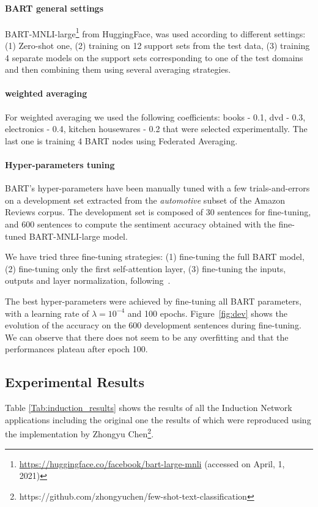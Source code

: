 \documentclass{esannV2}
\begin{document}
        \paragraph{BART general settings} BART-MNLI-large\footnote{\url{https://huggingface.co/facebook/bart-large-mnli} (accessed on April, 1, 2021)} from HuggingFace, was used according to different settings: (1) Zero-shot one, (2) training on 12 support sets from the test data, (3) training 4 separate models on the support sets corresponding to one of the test domains and then combining them using several averaging strategies.
        
        \paragraph{weighted averaging} For weighted averaging we used the following coefficients: books - 0.1, dvd - 0.3, electronics - 0.4, kitchen housewares - 0.2 that were selected experimentally. The last one is training 4 BART nodes using Federated Averaging. 
        
        \paragraph{Hyper-parameters tuning}
        BART's hyper-parameters have been manually tuned with a few trials-and-errors
        on a development set extracted from the \textit{automotive} subset of the Amazon Reviews corpus.
        The development set is composed of 30 sentences for fine-tuning, and 600 sentences to compute the sentiment accuracy obtained with the fine-tuned BART-MNLI-large model.
        
        We have tried three fine-tuning strategies: (1) fine-tuning the full BART model, (2) fine-tuning only the first self-attention layer, (3) fine-tuning the inputs, outputs and layer normalization, following~\cite{}.
        
        The best hyper-parameters were achieved by fine-tuning all BART parameters, with a learning rate of $\lambda = 10^{-4}$ and 100 epochs. Figure~\ref{fig:dev} shows the evolution of the accuracy on the 600 development sentences during fine-tuning. We can observe that there does not seem to be any overfitting and that the performances plateau after epoch 100.
        
    \subsection{Experimental Results}
    Table \ref{Tab:induction_results} shows the results of all the Induction Network applications including the original one the results of which were reproduced using the implementation by Zhongyu Chen\footnote{https://github.com/zhongyuchen/few-shot-text-classification}.
    
\end{document}
